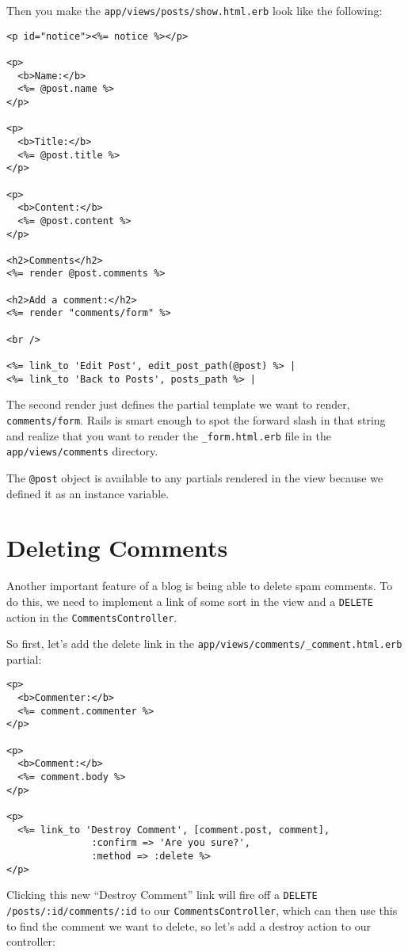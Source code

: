 \documentclass[10pt]{book}
\begin{document}
Then you make the \texttt{app/views/posts/show.html.erb} look like the following:


\begin{verbatim}
<p id="notice"><%= notice %></p>
 
<p>
  <b>Name:</b>
  <%= @post.name %>
</p>
 
<p>
  <b>Title:</b>
  <%= @post.title %>
</p>
 
<p>
  <b>Content:</b>
  <%= @post.content %>
</p>
 
<h2>Comments</h2>
<%= render @post.comments %>
 
<h2>Add a comment:</h2>
<%= render "comments/form" %>
 
<br />
 
<%= link_to 'Edit Post', edit_post_path(@post) %> |
<%= link_to 'Back to Posts', posts_path %> |
\end{verbatim}

The second render just defines the partial template we want to render, \texttt{comments/form}. Rails is smart enough to spot the forward slash in that string and realize that you want to render the \texttt{\_form.html.erb} file in the \texttt{app/views/comments} directory.

The \texttt{@post} object is available to any partials rendered in the view because we defined it as an instance variable.

\section{ Deleting Comments}

Another important feature of a blog is being able to delete spam comments. To do this, we need to implement a link of some sort in the view and a \texttt{DELETE} action in the \texttt{CommentsController}.

So first, let’s add the delete link in the \texttt{app/views/comments/\_comment.html.erb} partial:


\begin{verbatim}
<p>
  <b>Commenter:</b>
  <%= comment.commenter %>
</p>
 
<p>
  <b>Comment:</b>
  <%= comment.body %>
</p>
 
<p>
  <%= link_to 'Destroy Comment', [comment.post, comment],
               :confirm => 'Are you sure?',
               :method => :delete %>
</p>
\end{verbatim}

Clicking this new “Destroy Comment” link will fire off a \texttt{DELETE /posts/:id/comments/:id} to our \texttt{CommentsController}, which can then use this to find the comment we want to delete, so let’s add a destroy action to our controller:
\end{document}
